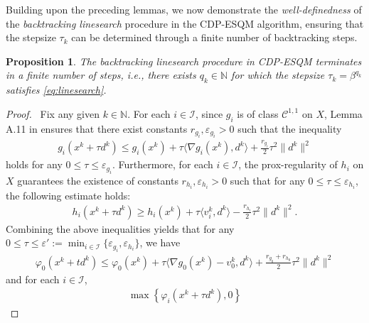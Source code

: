 \documentclass[11pt,a4paper]{article}
\newtheorem{proposition}[theorem]{Proposition}
\theoremstyle{plain}
\begin{document}
Building upon the preceding lemmas, we now demonstrate the \emph{well-definedness} of the \emph{backtracking linesearch} procedure in the CDP-ESQM algorithm, ensuring that the stepsize $\tau_k$ can be determined through a finite number of backtracking steps.
\begin{proposition}
\label{lemma:stepsize_existence}
The backtracking linesearch procedure in CDP-ESQM terminates in a finite number of steps, i.e., there exists $q_k \in \mathbb{N}$ for which the stepsize $\tau_k = \beta^{q_k}$ satisfies \eqref{eq:linesearch}.
\end{proposition}
\begin{proof}\, 
Fix any given $k\in\mathbb N$. For each $i \in \mathcal{I}$, since {$g_i$} is of class $\mathcal{C}^{1,1}$ on $X$, Lemma A.11 in \cite{IzmailovSolodov2014} ensures that there exist constants {$r_{g_i}, \varepsilon_{g_i} > 0$} such that the inequality
\begin{equation*}
    \begin{aligned}
       g_i(x^k+ \tau d^k) \leq g_i(x^k) + \tau\langle\nabla g_i(x^k),d^k\rangle + \frac{r_{g_i}}{2}\tau^2\|d^k\|^2 
    \end{aligned}
\end{equation*}
holds for any $0 \le \tau \le \varepsilon_{g_i}$. Furthermore, for each $i \in \mathcal{I}$, the prox-regularity of {$h_i$} on $X$ guarantees the existence of constants {$r_{h_i}, \varepsilon_{h_i} > 0$} such that for any $0 \le \tau \le \varepsilon_{h_i}$, the following estimate holds:
\begin{equation*}
    \begin{aligned}
        h_i(x^k+\tau d^k) \geq h_i(x^k) + \tau\langle v_i^k,d^k \rangle - \frac{r_{h_i}}{2}\tau^2\|d^k\|^2. 
    \end{aligned}
\end{equation*}
Combining the above inequalities yields that for any $0 \le \tau \le \varepsilon' := \min_{i\in\mathcal{I}}\{\varepsilon_{g_i}, \varepsilon_{h_i}\}$, we have
\begin{equation*}
    \begin{aligned}
        \varphi_0(x^k+td^k) \leq \varphi_0(x^k) + \tau\langle \nabla g_0(x^k) -v_0^k,d^k \rangle + \frac{r_{g_0}+r_{h_0}}{2}\tau^2\|d^k\|^2
    \end{aligned}
\end{equation*}
and for each $i \in \mathcal{I}$,
\begin{equation*}
   \begin{aligned}
  \max\left\{ \varphi_i(x^k+ \tau d^k), 0 \right\} 

\end{aligned}
\end{equation*}
\end{proof}
\end{document}
